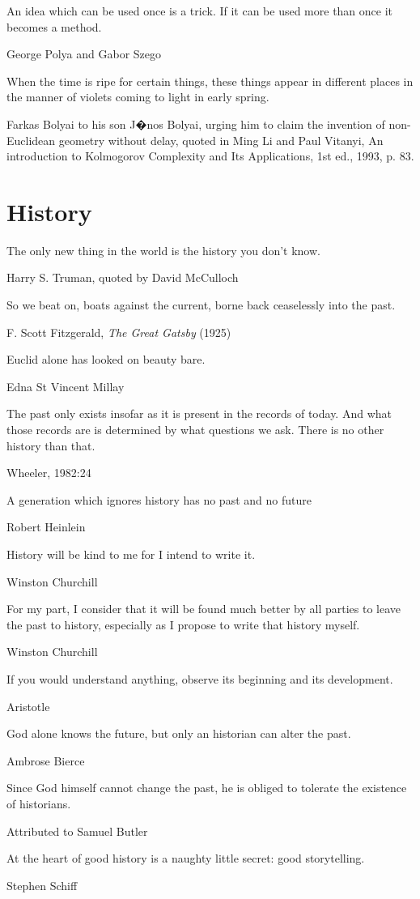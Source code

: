 \epigraph{An idea which can be used once is a trick. If it can be used more than once it becomes a method.}{George Polya and Gabor Szego}


\epigraph{When the time is ripe for certain things, these things appear in different places in the manner of violets coming to light in early spring.}{Farkas Bolyai to his son J�nos Bolyai, urging him to claim the invention of non-Euclidean geometry without delay, quoted in Ming Li and Paul Vitanyi, An introduction to Kolmogorov Complexity and Its Applications, 1st ed., 1993, p. 83.}


\section{History}
\epigraph{The only new thing in the world is the history you don't know.}{Harry S. Truman, quoted by David McCulloch}

\epigraph{So we beat on, boats against the current, borne back ceaselessly into the past.}{F. Scott Fitzgerald, \emph{The Great Gatsby} (1925)}

\epigraph{Euclid alone has looked on beauty bare.}{Edna St Vincent Millay}

\epigraph{The past only exists insofar as it is present in the records of today. And what those records are is determined by what questions we ask.  There is no other history than that.}{Wheeler, 1982:24}

\epigraph{A generation which ignores history has no past and no future}{Robert Heinlein} %


\epigraph{History will be kind to me for I intend to write it.}{Winston Churchill}

\epigraph{For my part, I consider that it will be found much better by all parties to leave the past to history, especially as I propose to write that history myself.}{Winston Churchill}

\epigraph{If you would understand anything, observe its beginning and its development.}{Aristotle}

\epigraph{God alone knows the future, but only an historian can alter the past.}{Ambrose Bierce}

\epigraph{Since God himself cannot change the past, he is obliged to tolerate the existence of historians.}{Attributed to Samuel Butler}

\epigraph{At the heart of good history is a naughty little secret: good storytelling.}{Stephen Schiff}

